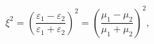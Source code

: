 \documentclass[12pt]{article}
\begin{document}
\begin{displaymath}
\xi ^ { 2 } = \left( \frac { \varepsilon _ { 1 } - \varepsilon _ { 2 } } { \varepsilon _ { 1 } + \varepsilon _ { 2 } } \right) ^ { 2 } = \left( \frac { \mu _ { 1 } - \mu _ { 2 } } { \mu _ { 1 } + \mu _ { 2 } } \right) ^ { 2 } ,
\end{displaymath}
\end{document}
